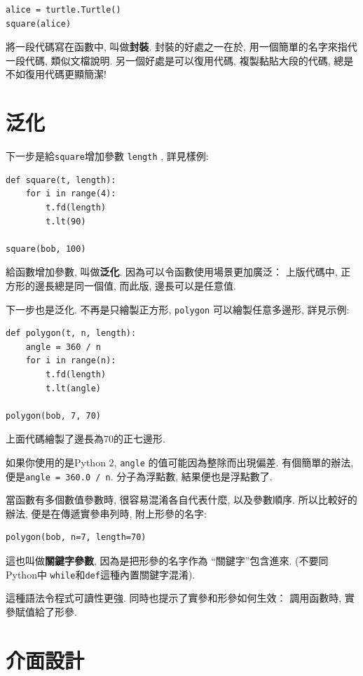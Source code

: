 \documentclass[10pt]{book}
\begin{document}
\begin{verbatim}
alice = turtle.Turtle()
square(alice)
\end{verbatim}
%
將一段代碼寫在函數中, 叫做{\bf 封裝}. 
封裝的好處之一在於, 用一個簡單的名字來指代一段代碼, 類似文檔說明. 
另一個好處是可以復用代碼, 複製黏貼大段的代碼, 總是
不如復用代碼更顯簡潔!


\section{泛化}

下一步是給{\tt square}增加參數 {\tt length} , 詳見樣例:

\begin{verbatim}
def square(t, length):
    for i in range(4):
        t.fd(length)
        t.lt(90)

square(bob, 100)
\end{verbatim}
%
給函數增加參數, 叫做{\bf 泛化}. 
因為可以令函數使用場景更加廣泛：
上版代碼中, 正方形的邊長總是同一個值, 
而此版, 邊長可以是任意值.

下一步也是泛化. 
不再是只繪製正方形, {\tt polygon} 可以繪製任意多邊形, 詳見示例:

\begin{verbatim}
def polygon(t, n, length):
    angle = 360 / n
    for i in range(n):
        t.fd(length)
        t.lt(angle)

polygon(bob, 7, 70)
\end{verbatim}
%
上面代碼繪製了邊長為70的正七邊形. 

如果你使用的是Python 2, {\tt angle} 的值可能因為整除而出現偏差. 
有個簡單的辦法, 便是{\tt angle = 360.0 / n}. 分子為浮點數, 結果便也是浮點數了. 

當函數有多個數值參數時, 很容易混淆各自代表什麼, 以及參數順序. 
所以比較好的辦法, 便是在傳遞實參串列時, 附上形參的名字:

\begin{verbatim}
polygon(bob, n=7, length=70)
\end{verbatim}
%
這也叫做{\bf 關鍵字參數}, 因為是把形參的名字作為 ``關鍵字''包含進來. 
(不要同Python中 {\tt while}和{\tt def}這種內置關鍵字混淆). 

這種語法令程式可讀性更強. 同時也提示了實參和形參如何生效：
調用函數時, 實參賦值給了形參. 


\section{介面設計}
\end{document}
